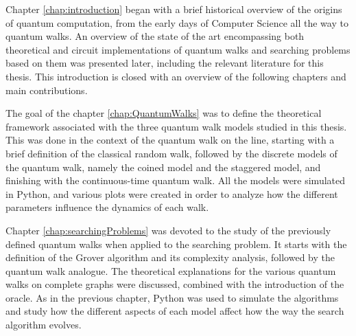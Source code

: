 \documentclass[../../dissertation.tex]{subfiles}
\begin{document}
Chapter \ref{chap:introduction} began with a brief historical overview of the
origins of quantum computation, from the early days of Computer
Science all the way to quantum walks. An overview of the state of the art
encompassing both theoretical and circuit implementations of quantum walks and
searching problems based on them was presented later, including the relevant
literature for this thesis. This introduction is closed with an overview of the following chapters and main contributions.\par

The goal of the chapter \ref{chap:QuantumWalks} was to define the theoretical
framework associated with the three quantum walk models studied in this thesis.
This was done in the context of the quantum walk on the line, starting with a
brief definition of the classical random walk, followed by the discrete models
of the quantum walk, namely the coined model and the staggered model, and
finishing with the continuous-time quantum walk. All the models were
simulated in Python, and various plots were created in order to analyze how
the different parameters influence the dynamics of each walk.\par

Chapter \ref{chap:searchingProblems} was devoted to the study of the
previously defined quantum walks when applied to the searching problem. It
starts with the definition of the Grover algorithm and its complexity analysis, followed by the quantum walk analogue. The theoretical
explanations for the various quantum walks on complete graphs were discussed,
combined with the introduction of the oracle. As in the previous
chapter, Python was used to simulate the algorithms and study how the different
aspects of each model affect how the way the search algorithm evolves.\par
\end{document}

